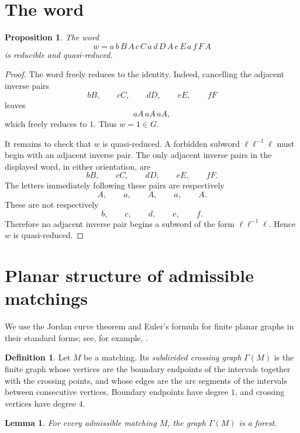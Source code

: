 \documentclass[12pt]{article}
\newtheorem{proposition}[theorem]{Proposition}
\newtheorem{lemma}[theorem]{Lemma}
\theoremstyle{definition}
\newtheorem{definition}[theorem]{Definition}
\begin{document}
\section{The word}

\begin{proposition}\label{prop:word}
The word
\[
w=a\,b\,B\,A\,c\,C\,a\,d\,D\,A\,e\,E\,a\,f\,F\,A
\]
is reducible and quasi-reduced.
\end{proposition}

\begin{proof}
The word freely reduces to the identity.  Indeed, cancelling the adjacent inverse pairs
\[
bB,\qquad cC,\qquad dD,\qquad eE,\qquad fF
\]
leaves
\[
aA\,aA\,aA,
\]
which freely reduces to \(1\).  Thus \(w=1\in G\).

It remains to check that \(w\) is quasi-reduced.  A forbidden subword \(\ell\ell^{-1}\ell\) must begin with an adjacent inverse pair.  The only adjacent inverse pairs in the displayed word, in either orientation, are
\[
bB,\qquad cC,\qquad dD,\qquad eE,\qquad fF.
\]
The letters immediately following these pairs are respectively
\[
A,\qquad a,\qquad A,\qquad a,\qquad A.
\]
These are not respectively
\[
b,\qquad c,\qquad d,\qquad e,\qquad f.
\]
Therefore no adjacent inverse pair begins a subword of the form \(\ell\ell^{-1}\ell\).  Hence \(w\) is quasi-reduced.
\end{proof}

\section{Planar structure of admissible matchings}

We use the Jordan curve theorem and Euler's formula for finite planar graphs in their standard forms; see, for example, \cite{Munkres}.

\begin{definition}
Let \(M\) be a matching.  Its \emph{subdivided crossing graph} \(\Gamma(M)\) is the finite graph whose vertices are the boundary endpoints of the intervals together with the crossing points, and whose edges are the arc segments of the intervals between consecutive vertices.  Boundary endpoints have degree \(1\), and crossing vertices have degree \(4\).
\end{definition}

\begin{lemma}\label{lem:forest}
For every admissible matching \(M\), the graph \(\Gamma(M)\) is a forest.
\end{lemma}
\end{document}
